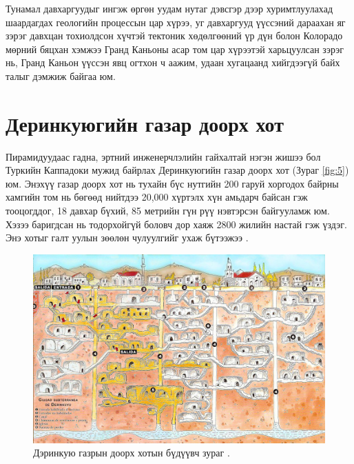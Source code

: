 \documentclass[10pt,twocolumn,letterpaper]{article}
\begin{document}
Тунамал давхаргуудыг ингэж өргөн уудам нутаг дэвсгэр дээр хуримтлуулахад шаардагдах геологийн процессын цар хүрээ, уг давхаргууд үүссэний дараахан яг зэрэг давхцан тохиолдсон хүчтэй тектоник хөдөлгөөний үр дүн болон Колорадо мөрний бяцхан хэмжээ Гранд Каньоны асар том цар хүрээтэй харьцуулсан зэрэг нь, Гранд Каньон үүссэн явц огтхон ч аажим, удаан хугацаанд хийгдээгүй байх талыг дэмжиж байгаа юм.

\section{Деринкуюгийн газар доорх хот}

Пирамидуудаас гадна, эртний инженерчлэлийн гайхалтай нэгэн жишээ бол Туркийн Каппадоки мужид байрлах Деринкуюгийн газар доорх хот (Зураг \ref{fig:5}) юм. Энэхүү газар доорх хот нь тухайн бүс нутгийн 200 гаруй хоргодох байрны хамгийн том нь бөгөөд \cite{54} нийтдээ 20,000 хүртэлх хүн амьдарч байсан гэж тооцогддог, 18 давхар бүхий, 85 метрийн гүн рүү нэвтэрсэн байгууламж юм. Хэзээ баригдсан нь тодорхойгүй боловч дор хаяж 2800 жилийн настай гэж үздэг. Энэ хотыг галт уулын зөөлөн чулуулгийг ухаж бүтээжээ \cite{52, 53}.

\begin{figure}[b]
\begin{center}
\includegraphics[width=1\linewidth]{derinkuyu.jpeg}
\end{center}
   \caption{Дэринкую газрын доорх хотын бүдүүвч зураг \cite{56}.}
\label{fig:5}
\label{fig:onecol}
\end{figure}
\end{document}
